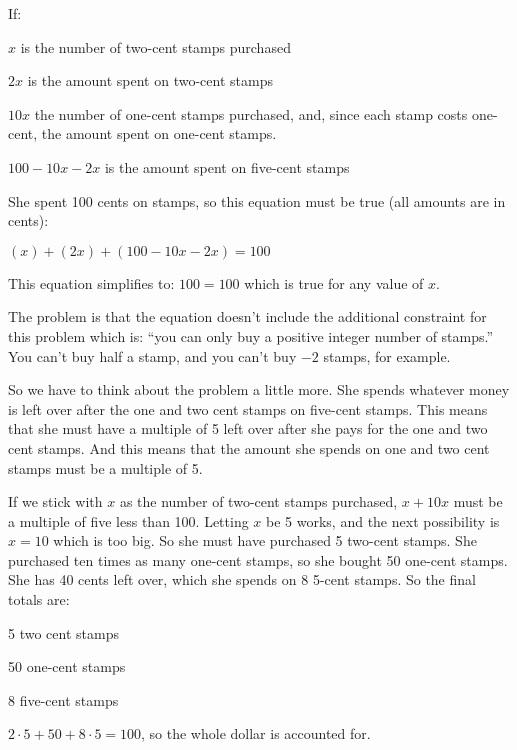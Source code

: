 \documentclass[fleqn,addpoints]{exam}
\begin{document}
\begin{solution}

If:
\begin{itemize*}
  \item $x$ is the number of two-cent stamps purchased
  \item $2x$ is the amount spent on two-cent stamps
  \item $10x$ the number of one-cent stamps purchased, and, since each stamp costs one-cent, the amount spent on one-cent stamps.
  \item $100 - 10x - 2x$ is the amount spent on five-cent stamps
\end{itemize*}

She spent 100 cents on stamps, so this equation must be true (all amounts are in cents):

\( (x) + (2x) + (100 - 10x - 2x) = 100 \)

This equation simplifies to: $ 100 = 100 $ which is true for any value of $x$.  

The problem is that the equation doesn't include the additional constraint for this problem which is: ``you can only
buy a positive integer number of stamps.''  You can't buy half a stamp, and you can't buy $-2$ stamps, for example.

So we have to think about the problem a little more.  She spends whatever money is left over after the one and
two cent stamps on five-cent stamps.  This means that she must have a multiple of 5 left over after she pays for the one
and two cent stamps.  And this means that the amount she spends on one and two cent stamps must be a multiple of 5.  

If we stick with $x$ as the number of two-cent stamps purchased, $x + 10x$ must be a multiple of five less than 100.
Letting $x$ be 5 works, and the next possibility is $x=10$ which is too big.  So she must have purchased 5 two-cent
stamps.  She purchased ten times as many one-cent stamps, so she bought 50 one-cent stamps.  She has 40 cents left over,
which she spends on 8 5-cent stamps.  So the final totals are:

\begin{itemize*}
  \item 5 two cent stamps
  \item 50 one-cent stamps
  \item 8 five-cent stamps
\end{itemize*}

\( 2 \cdot 5 + 50 + 8 \cdot 5 = 100 \), so the whole dollar is accounted for.

\end{solution}
\end{document}
